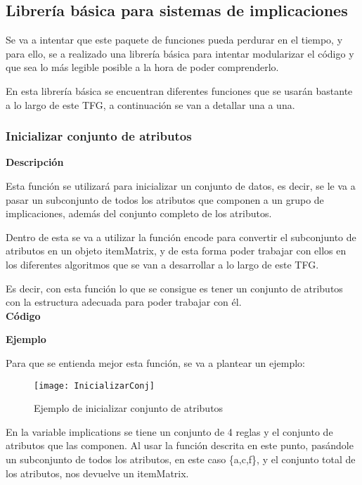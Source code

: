 \subsection{Librer\'ia b\'asica para sistemas de implicaciones}
Se va a intentar que este paquete de funciones pueda perdurar en el tiempo, y para ello, 
se a realizado una librer\'ia b\'asica para intentar modularizar el c\'odigo y que sea lo 
m\'as legible posible a la hora de poder comprenderlo.

En esta librer\'ia b\'asica se encuentran diferentes funciones que se usar\'an bastante a lo largo de este TFG, a continuaci\'on 
se van a detallar una a una.


\subsubsection{Inicializar conjunto de atributos}

    \textbf{Descripci\'on}

    Esta funci\'on se utilizar\'a para inicializar un conjunto de datos, es decir, se le va a pasar un subconjunto 
    de todos los atributos que componen a un grupo de implicaciones, adem\'as del conjunto completo de los atributos. 
    
    Dentro de esta se va a utilizar la funci\'on encode para convertir el subconjunto de atributos en un objeto itemMatrix, y de esta 
    forma poder trabajar con ellos en los diferentes algoritmos que se van a desarrollar a lo largo de este TFG.

    Es decir, con esta funci\'on lo que se consigue es tener un conjunto de atributos con la estructura adecuada para poder trabajar con \'el.
    \\

    
    \textbf{C\'odigo}
    
    
    \bigskip
    
    \textbf{Ejemplo}

    Para que se entienda mejor esta funci\'on, se va a plantear un ejemplo:

    \begin{figure}[H]
        \centering
        \texttt{[image: InicializarConj]}
        \caption{Ejemplo de inicializar conjunto de atributos}
        \label{fig:InicializarConj}
    \end{figure}

    En la variable implications se tiene un conjunto de 4 reglas y el conjunto de atributos que las componen.
    Al usar la funci\'on descrita en este punto, pas\'andole un subconjunto de todos los atributos, en este caso \{a,c,f\}, y 
    el conjunto total de los atributos, nos devuelve un itemMatrix. 
    
